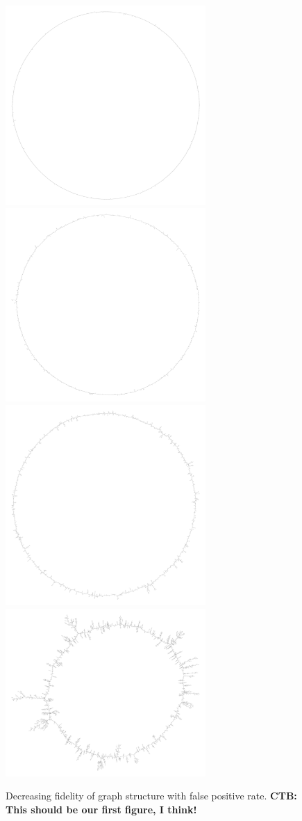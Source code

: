 \documentclass[12pt]{article} \usepackage{simplemargins}
\begin{document}
\begin{figure}
\includegraphics[width=3in]{figures/f3b001}
\includegraphics[width=3in]{figures/f3b005}\\
\includegraphics[width=3in]{figures/f3b010}
\includegraphics[width=3in]{figures/f3b015}
\caption{Decreasing fidelity of graph structure with false positive rate.
{\bf CTB: This should be our first figure, I think!}}
\end{figure}
\end{document}

